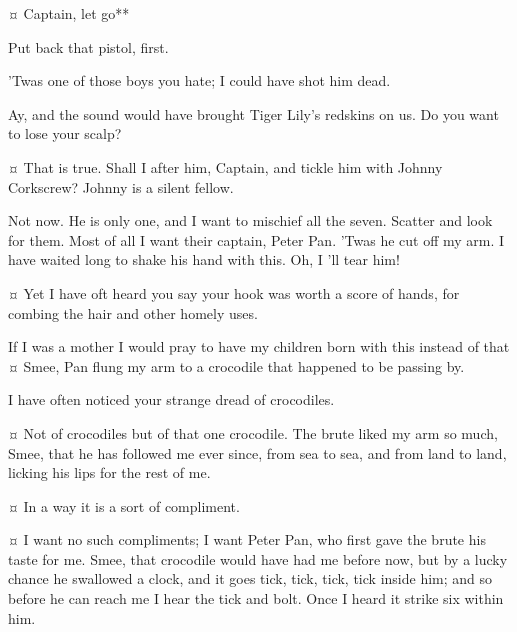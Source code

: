 \begin{drama}

\starkeyspeaks {}¤
Captain, let go**

\hookspeaks
Put back that pistol, first.

\starkeyspeaks
'Twas one of those boys you hate; I could have shot him dead.

\hookspeaks
Ay, and the sound would have brought Tiger Lily's redskins on us.
Do you want to lose your scalp?

\smeespeaks {}¤
That is true.
Shall I after him, Captain, and tickle him with Johnny Corkscrew?
Johnny is a silent fellow.

\hookspeaks
Not now.
He is only one, and I want to mischief all the seven.
Scatter and look for them.
Most of all I want their captain, Peter Pan.
'Twas he cut off my arm.
I have waited long to shake his hand with this.
Oh, I 'll tear him!

\smeespeaks {}¤
Yet I have oft heard you say your hook was worth a score of hands, for combing the hair and other homely uses.

\hookspeaks
If I was a mother I would pray to have my children born with this instead of that
¤
Smee, Pan flung my arm to a crocodile that happened to be passing by.

\smeespeaks
I have often noticed your strange dread of crocodiles.

\hookspeaks {}¤
Not of crocodiles but of that one crocodile.
The brute liked my arm so much, Smee, that he has followed me ever since, from sea to sea, and from land to land, licking his lips for the rest of me.

\smeespeaks {}¤
In a way it is a sort of compliment.

\hookspeaks {}¤
I want no such compliments; I want Peter Pan, who first gave the brute his taste for me.
Smee, that crocodile would have had me before now, but by a lucky chance he swallowed a clock, and it goes tick, tick, tick, tick inside him; and so before he can reach me I hear the tick and bolt.
Once I heard it strike six within him.


\end{drama}
